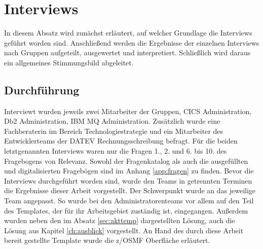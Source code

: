 \section{Interviews}
In diesem Absatz wird zunächst erläutert, auf welcher Grundlage die Interviews geführt worden sind.
Anschließend werden die Ergebnisse der einzelnen Interviews nach Gruppen aufgeteilt, ausgewertet und interpretiert.
Schließlich wird daraus ein allgemeines Stimmungsbild abgeleitet.

\subsection{Durchführung}
Interviewt wurden jeweils zwei Mitarbeiter der Gruppen, CICS Administration, Db2 Administration, IBM MQ Administration.
Zusätzlich wurde eine Fachberaterin im Bereich Technologiestrategie und ein Mitarbeiter des Entwicklerteams der DATEV Rechnungsschreibung befragt.
Für die beiden letztgenannten Interviews waren nur die Fragen 1., 2. und 6. bis 10. des Fragebogens von Relevanz.
Sowohl der Fragenkatalog als auch die ausgefüllten und digitalisierten Fragebögen sind im Anhang \ref{app:fragen} zu finden.
Bevor die Interviews durchgeführt worden sind, wurde den Teams in getrennten Terminen die Ergebnisse dieser Arbeit vorgestellt.
Der Schwerpunkt wurde an das jeweilige Team angepasst.
So wurde bei den Administratorenteams vor allem auf den Teil des Templates, der für ihr Arbeitsgebiet zuständig ist, eingegangen.
Außerdem wurden neben den im Absatz \ref{sec:akttemp} dargestellten Lösung, auch die Lösung aus Kapitel \ref{ch:ausblick} vorgestellt.
An Hand des durch diese Arbeit bereit gestellte Template wurde die z/OSMF Oberfläche erläutert.

